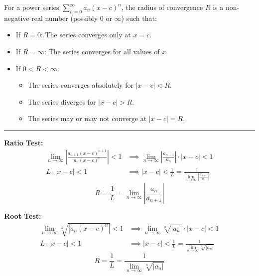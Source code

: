 \documentclass[a4paper,11pt]{article}
\begin{document}
\begin{tcolorbox}
    For a power series $\textstyle \sum_{n=0}^{\infty} a_n (x - c)^n$, the radius of convergence $R$ is a non-negative real number (possibly $0$ or $\infty$) such that:
    \begin{itemize}
        \item If $R = 0$: The series converges only at $x = c$.
        \item If $R = \infty$: The series converges for all values of $x$.
        \item If $0 < R < \infty$:
        \begin{itemize}[label=$\circ$]
            \item The series converges absolutely for $|x - c| < R$.
            \item The series diverges for $|x - c| > R$.
            \item The series may or may not converge at $|x - c| = R$.
        \end{itemize}
    \end{itemize}
    
    \vspace{5pt}
    \hrule
    \vspace{10pt}
    
    \textbf{Ratio Test:}
    \begin{align*}
        \lim_{n \to \infty} \left| \frac{a_{n+1} (x-c)^{n+1}}{a_n (x - c)^n} \right| < 1 &\implies \lim_{n \to \infty} \left| \frac{a_{n+1}}{a_n} \right| \cdot \left| x - c \right| < 1 \\[8pt]
        L \cdot \left| x - c \right| < 1 &\implies \left| x - c \right| < \frac{1}{L} = \frac{1}{\lim_{n \to \infty} \left| \frac{a_{n+1}}{a_n} \right|}
    \end{align*}
    \[ \boxed{R = \frac{1}{L} = \lim_{n \to \infty} \left| \frac{a_n}{a_{n+1}} \right|} \]
    
    \textbf{Root Test:}
    \begin{align*}
        \lim_{n \to \infty} \sqrt[n]{\left| a_n (x - c)^n \right|} < 1 &\implies  \lim_{n \to \infty} \sqrt[n]{\left| a_n \right|} \cdot \left| x - c \right| < 1 \\[8pt]
        L \cdot \left| x - c \right| < 1 &\implies \left| x - c \right| < \frac{1}{L} = \frac{1}{\lim_{n \to \infty} \sqrt[n]{ \left| a_n \right|}}
    \end{align*}
    \[ \boxed{R = \frac{1}{L} = \frac{1}{\lim_{n \to \infty} \sqrt[n]{|a_n|}}} \]
\end{tcolorbox}
\end{document}
